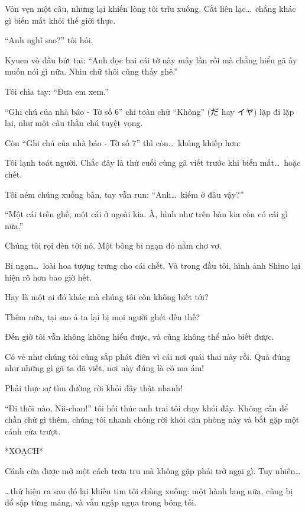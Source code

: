 \documentclass[../main.tex]{subfiles}
\begin{document}
Vỏn vẹn một câu, nhưng lại khiến lòng tôi trĩu xuống. Cắt liên lạc\dots\ chẳng khác gì biến mất khỏi thế giới thực.

``Anh nghĩ sao?'' tôi hỏi.

Kyuen vò đầu bứt tai: ``Anh đọc hai cái tờ này mấy lần rồi mà chẳng hiểu gã ấy muốn nói gì nữa. Nhìn chữ thôi cũng thấy ghê.''

Tôi chìa tay: ``Đưa em xem.''

``{\vnmsans Ghi chú của nhà báo - Tờ số 6}'' chỉ toàn chữ ``Không'' (だ hay イヤ) lặp đi lặp lại, như một câu thần chú tuyệt vọng.

Còn ``{\vnmsans Ghi chú của nhà báo - Tờ số 7}'' thì còn\dots\ khủng khiếp hơn:


Tôi lạnh toát người. Chắc đây là thứ cuối cùng gã viết trước khi biến mất\dots\ hoặc chết.

Tôi ném chúng xuống bàn, tay vẫn run: ``Anh\dots\ kiếm ở đâu vậy?''

``Một cái trên ghế, một cái ở ngoài kia. À, hình như trên bàn kia còn có cái gì nữa.''

Chúng tôi rọi đèn tới nó. Một bông bỉ ngạn đỏ nằm chơ vơ.

Bỉ ngạn\dots\ loài hoa tượng trưng cho cái chết. Và trong đầu tôi, hình ảnh Shino lại hiện rõ hơn bao giờ hết.

Hay là một ai đó khác mà chúng tôi còn không biết tới?

Thêm nữa, tại sao ả ta lại bị mọi người ghét đến thế?

Đến giờ tôi vẫn không không hiểu được, và cũng không thể nào biết được.

Có vẻ như chúng tôi cũng sắp phát điên vì cái nơi quái thai này rồi. Quả đúng như những gì gã ta đã viết, nơi này đúng là có ma ám!

Phải thực sự tìm đường rời khỏi đây thật nhanh!

``Đi thôi nào, Nii-chan!'' tôi hối thúc anh trai tôi chạy khỏi đây. Không cần để chần chừ gì thêm, chúng tôi nhanh chóng rời khỏi căn phòng này và bắt gặp một cánh cửa trượt.

*XOẠCH*

Cánh cừa được mở một cách trơn tru mà không gặp phải trở ngại gì. Tuy nhiên\dots

\dots thứ hiện ra sau đó lại khiến tim tôi chùng xuống: một hành lang nữa, cũng bị đổ sập từng mảng, và vẫn ngập ngụa trong bóng tối.
\end{document}
